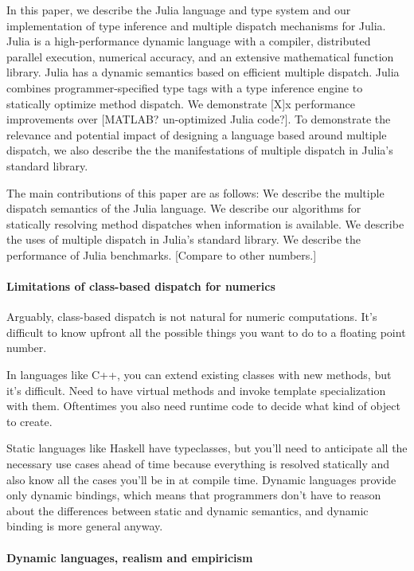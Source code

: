In this paper, we describe the Julia language and type system and our implementation of type inference and multiple dispatch mechanisms for Julia. Julia is a high-performance dynamic language with a compiler, distributed parallel execution, numerical accuracy, and an extensive mathematical function library. Julia has a dynamic semantics based on efficient multiple dispatch. Julia combines programmer-specified type tags with a type inference engine to statically optimize method dispatch. We demonstrate [X]x performance improvements over [MATLAB? un-optimized Julia code?]. To demonstrate the relevance and potential impact of designing a language based around multiple dispatch, we also describe the the manifestations of multiple dispatch in Julia's standard library.

The main contributions of this paper are as follows:
We describe the multiple dispatch semantics of the Julia language.
We describe our algorithms for statically resolving method dispatches when information is available.
We describe the uses of multiple dispatch in Julia’s standard library.
We describe the performance of Julia benchmarks. [Compare to other numbers.]

\paragraph{Limitations of class-based dispatch for numerics} %

Arguably, class-based dispatch is not natural for numeric computations. It's difficult to know upfront all the possible things you want to do to a floating point number.

In languages like C++, you can extend existing classes with new methods, but it's difficult. Need to have virtual methods and invoke template specialization with them. Oftentimes you also need runtime code to decide what kind of object to create.

Static languages like Haskell have typeclasses\cite{typeclass}, but you'll need to anticipate all the necessary use cases ahead of time because everything is resolved statically and also know all the cases you'll be in at compile time. Dynamic languages provide only dynamic bindings,  which means that programmers don't have to reason about the differences between static and dynamic semantics, and dynamic binding is more general anyway.

\paragraph{Dynamic languages, realism and empiricism}

